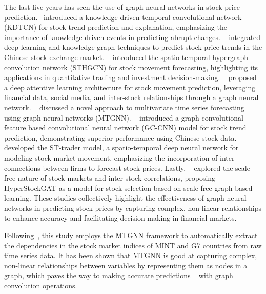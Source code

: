 The last five years has seen the use of graph neural
networks in stock price prediction.~\cite{deng2019knowledge} introduced a knowledge-driven temporal convolutional
network (KDTCN) for stock trend prediction and explanation, emphasizing the
importance of knowledge-driven events in predicting abrupt changes.
~\cite{long2020integrated} integrated deep learning and knowledge graph
techniques to predict stock price trends in the Chinese stock exchange market.
~\cite{sawhney2020spatiotemporal} introduced the spatio-temporal hypergraph
convolution network (STHGCN) for stock movement forecasting, highlighting its
applications in quantitative trading and investment decision-making.
~\cite{sawhney2020deep} proposed a deep attentive learning
architecture for stock movement prediction, leveraging financial data, social
media, and inter-stock relationships through a graph neural network.
~\cite{wu2020connecting} discussed a novel approach to multivariate time series
forecasting using graph neural networks (MTGNN). ~\cite{chen2021novel}
introduced a graph convolutional feature based convolutional neural network
(GC-CNN) model for stock trend prediction, demonstrating superior performance
using Chinese stock data. ~\cite{hou2021st} developed the ST-trader model, a
spatio-temporal deep neural network for modeling stock market movement,
emphasizing the incorporation of inter-connections between firms to forecast
stock prices. Lastly, ~\cite{sawhney2021exploring} explored the scale-free
nature of stock markets and inter-stock correlations, proposing HyperStockGAT as
a model for stock selection based on scale-free graph-based learning. These
studies collectively highlight the effectiveness of graph neural networks in 
predicting stock prices by capturing complex, non-linear relationships to 
enhance accuracy and facilitating decision making in financial markets.

Following~\cite{wu2020connecting}, this study employs the MTGNN framework  to
automatically extract the dependencies in the stock market indices of MINT and
G7 countries from raw time series data. It has been shown that MTGNN is good at 
capturing complex, non-linear relationships between variables by representing
them as nodes in a graph, which paves the way to making accurate predictions
~\cite{wu2020connecting, cui2021metro, he2022multivariate,
liu2022multivariate, jin2022multivariate, chen2022multi, chen2023multi} with 
graph convolution operations.

